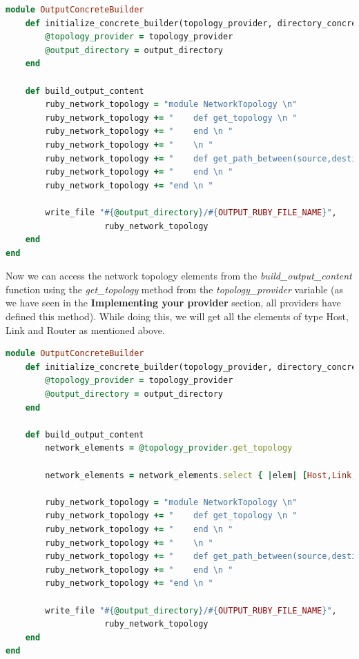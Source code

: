 \begin{lstlisting}[language=Ruby,breaklines=true]
module OutputConcreteBuilder
	def initialize_concrete_builder(topology_provider, directory_concrete_builders, output_directory)
		@topology_provider = topology_provider
		@output_directory = output_directory
	end
    
    def build_output_content
    	ruby_network_topology = "module NetworkTopology \n"
    	ruby_network_topology += "    def get_topology \n "
    	ruby_network_topology += "    end \n "
    	ruby_network_topology += "    \n "
    	ruby_network_topology += "    def get_path_between(source,destination) \n "
    	ruby_network_topology += "    end \n "
    	ruby_network_topology += "end \n "
    	
    	write_file "#{@output_directory}/#{OUTPUT_RUBY_FILE_NAME}",
                    ruby_network_topology
    end
end
\end{lstlisting}

Now we can access the network topology elements from the \textit{build\_output\_content} function using the \textit{get\_topology} method from the \textit{topology\_provider} variable (as we have seen in the \textbf{Implementing your provider} section, all providers have defined this method). While doing this, we will get all the elements of type Host, Link and Router as mentioned above. 

\begin{lstlisting}[language=Ruby,breaklines=true]
module OutputConcreteBuilder
	def initialize_concrete_builder(topology_provider, directory_concrete_builders, output_directory)
		@topology_provider = topology_provider
		@output_directory = output_directory
	end
    
    def build_output_content
		network_elements = @topology_provider.get_topology
        
        network_elements = network_elements.select { |elem| [Host,Link,Router].include? elem.class }    
    
    	ruby_network_topology = "module NetworkTopology \n"
    	ruby_network_topology += "    def get_topology \n "
    	ruby_network_topology += "    end \n "
    	ruby_network_topology += "    \n "
    	ruby_network_topology += "    def get_path_between(source,destination) \n "
    	ruby_network_topology += "    end \n "
    	ruby_network_topology += "end \n "
    	
    	write_file "#{@output_directory}/#{OUTPUT_RUBY_FILE_NAME}",
                    ruby_network_topology
    end
end
\end{lstlisting}

